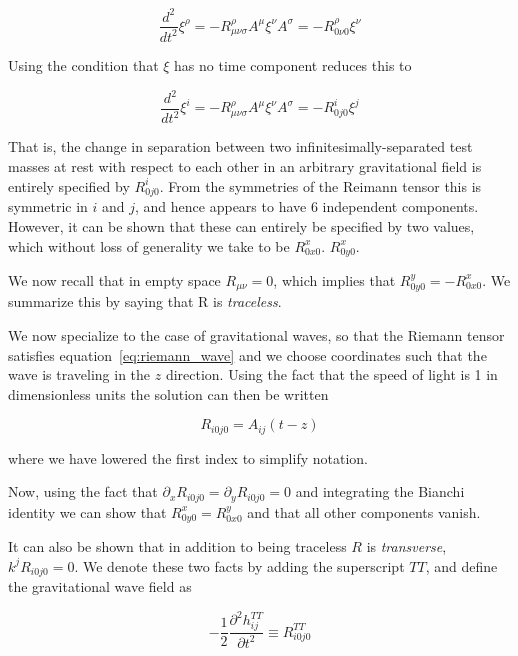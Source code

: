 \begin{equation}
\label{eq:geodesic_deviation}
\frac{d^2}{dt^2} \xi^\rho = -R^\rho_{\mu\nu\sigma} A^\mu \xi^\nu A^\sigma
=-R^\rho_{0 \nu 0} \xi^\nu 
\end{equation}

Using the condition that $\xi$ has no time component reduces this to 

\begin{equation}
\frac{d^2}{dt^2} \xi^i = -R^\rho_{\mu\nu\sigma} A^\mu \xi^\nu A^\sigma
=-R^i_{0 j 0} \xi^j
\end{equation}

That is, the change in separation between two
infinitesimally-separated test masses at rest with respect to each
other in an arbitrary gravitational field is entirely specified by
$R^i_{0 j 0}$.  From the symmetries of the Reimann tensor this is
symmetric in $i$ and $j$, and hence appears to have 6 independent
components.  However, it can be shown that these can entirely be
specified by two values, which without loss of generality we take to
be $R^x_{0 x 0}$.  $R^x_{0 y 0}$.

We now recall that in empty space $R_{\mu\nu} = 0$, which implies that
$R^y_{0 y 0} = - R^x_{0 x 0}$.  We summarize this by saying that R is
\emph{traceless}.  

We now specialize to the case of gravitational waves, so that the
Riemann tensor satisfies equation~\ref{eq:riemann_wave} and we choose
coordinates such that the wave is traveling in the $z$ direction.
Using the fact that the speed of light is 1 in dimensionless units the
solution can then be written

\begin{equation*}
R_{i 0 j 0} = A_{ij}(t - z)
\end{equation*}

where we have lowered the first index to simplify notation.

Now, using the fact that $\partial_x R_{i0j0} = \partial_y R_{i0j0}
= 0$ and integrating the Bianchi identity we can show that
$R^x_{0 y 0} = R^y_{0 x 0}$ and that all other components vanish.

It can also be shown that in addition to being traceless $R$ is
\emph{transverse}, $k^j R_{i0j0} = 0$.  We denote these two facts by
adding the superscript $TT$, and define the gravitational wave field as

\begin{equation}
\label{eq:wave_field}
-\frac{1}{2} \frac{\partial^2 h_{ij}^{TT}}{\partial t^2}
\equiv R^{TT}_{i0j0}
\end{equation}

